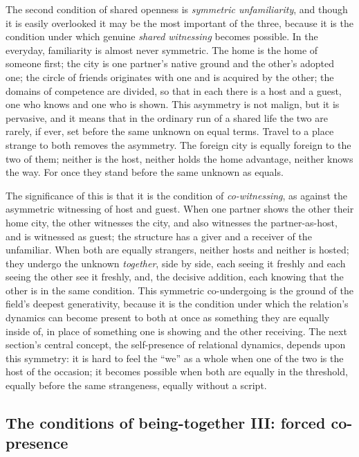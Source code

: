 The second condition of shared openness is \emph{symmetric unfamiliarity}, and though it is easily overlooked it may be the most important of the three, because it is the condition under which genuine \emph{shared witnessing} becomes possible. In the everyday, familiarity is almost never symmetric. The home is the home of someone first; the city is one partner's native ground and the other's adopted one; the circle of friends originates with one and is acquired by the other; the domains of competence are divided, so that in each there is a host and a guest, one who knows and one who is shown. This asymmetry is not malign, but it is pervasive, and it means that in the ordinary run of a shared life the two are rarely, if ever, set before the same unknown on equal terms. Travel to a place strange to both removes the asymmetry. The foreign city is equally foreign to the two of them; neither is the host, neither holds the home advantage, neither knows the way. For once they stand before the same unknown as equals.

The significance of this is that it is the condition of \emph{co-witnessing}, as against the asymmetric witnessing of host and guest. When one partner shows the other their home city, the other witnesses the city, and also witnesses the partner-as-host, and is witnessed as guest; the structure has a giver and a receiver of the unfamiliar. When both are equally strangers, neither hosts and neither is hosted; they undergo the unknown \emph{together}, side by side, each seeing it freshly and each seeing the other see it freshly, and, the decisive addition, each knowing that the other is in the same condition. This symmetric co-undergoing is the ground of the field's deepest generativity, because it is the condition under which the relation's dynamics can become present to both at once as something they are equally inside of, in place of something one is showing and the other receiving. The next section's central concept, the self-presence of relational dynamics, depends upon this symmetry: it is hard to feel the ``we'' as a whole when one of the two is the host of the occasion; it becomes possible when both are equally in the threshold, equally before the same strangeness, equally without a script.

\subsection{The conditions of being-together III: forced co-presence}
\label{p21:sub:field-copresence}

